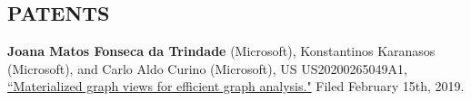 \documentclass[line,margin]{res}
\begin{document}
\begin{resume}
%

\section{PATENTS}
\textbf{Joana Matos Fonseca da Trindade} (Microsoft), Konstantinos Karanasos (Microsoft), and Carlo Aldo Curino (Microsoft), US US20200265049A1, \href{https://patents.google.com/patent/US20200265049A1/en}{``Materialized graph views for efficient graph analysis."} Filed February 15th, 2019.


\end{resume}
\end{document}

